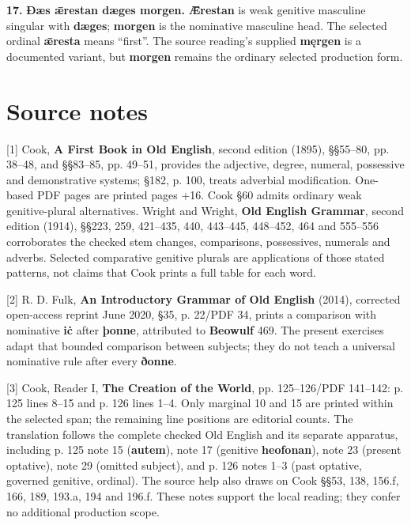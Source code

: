 \par\begin{minipage}{\linewidth}\raggedright
\textbf{17.} \textbf{Ðæs ǣrestan dæges morgen.} \textbf{Ǣrestan} is weak genitive masculine singular with \textbf{dæges}; \textbf{morgen} is the nominative masculine head. The selected ordinal \textbf{ǣresta} means “first”. The source reading’s supplied \textbf{męrgen} is a documented variant, but \textbf{morgen} remains the ordinary selected production form.

\end{minipage}\par\addvspace{4pt}

\clearpage
\section*{Source notes}

\begingroup\fontsize{10}{12.8}\selectfont
[1] Cook, \textbf{A First Book in Old English}, second edition (1895), §§55–80, pp. 38–48, and §§83–85, pp. 49–51, provides the adjective, degree, numeral, possessive and demonstrative systems; §182, p. 100, treats adverbial modification. One-based PDF pages are printed pages +16. Cook §60 admits ordinary weak genitive-plural alternatives. Wright and Wright, \textbf{Old English Grammar}, second edition (1914), §§223, 259, 421–435, 440, 443–445, 448–452, 464 and 555–556 corroborates the checked stem changes, comparisons, possessives, numerals and adverbs. Selected comparative genitive plurals are applications of those stated patterns, not claims that Cook prints a full table for each word.

[2] R. D. Fulk, \textbf{An Introductory Grammar of Old English} (2014), corrected open-access reprint June 2020, §35, p. 22/\allowbreak{}PDF 34, prints a comparison with nominative \textbf{iċ} after \textbf{þonne}, attributed to \textbf{Beowulf} 469. The present exercises adapt that bounded comparison between subjects; they do not teach a universal nominative rule after every \textbf{ðonne}.

[3] Cook, Reader I, \textbf{The Creation of the World}, pp. 125–126/\allowbreak{}PDF 141–142: p. 125 lines 8–15 and p. 126 lines 1–4. Only marginal 10 and 15 are printed within the selected span; the remaining line positions are editorial counts. The translation follows the complete checked Old English and its separate apparatus, including p. 125 note 15 (\textbf{autem}), note 17 (genitive \textbf{heofonan}), note 23 (present optative), note 29 (omitted subject), and p. 126 notes 1–3 (past optative, governed genitive, ordinal). The source help also draws on Cook §§53, 138, 156.f, 166, 189, 193.a, 194 and 196.f. These notes support the local reading; they confer no additional production scope.

\endgroup

\par\label{end-ch03-key}
\clearpage\endgroup
